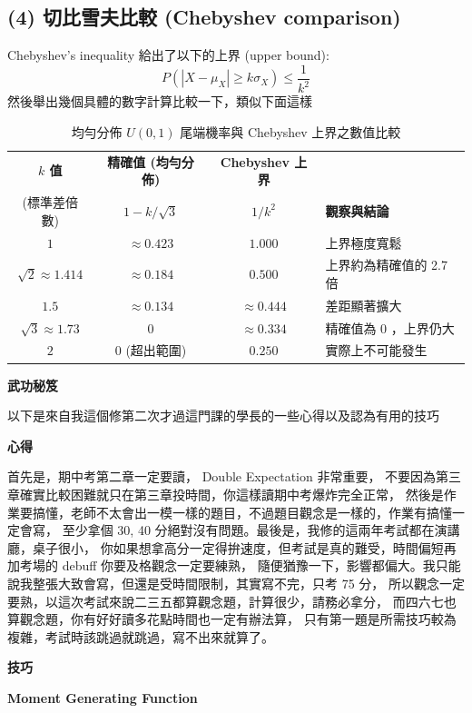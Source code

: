 \documentclass{article}
\begin{document}
\subsection*{(4) 切比雪夫比較 (Chebyshev comparison)}
Chebyshev's inequality 給出了以下的上界 (upper bound):
$$
P\!\left(|X-\mu_X|\ge k\sigma_X\right)\le \frac{1}{k^2}
$$
然後舉出幾個具體的數字計算比較一下，類似下面這樣
\begin{table}[htbp]
    \centering
    \caption{均勻分佈 $U(0,1)$ 尾端機率與 Chebyshev 上界之數值比較}
    \renewcommand{\arraystretch}{1.3}
    \begin{tabular}{cccl}
    \toprule
    \textbf{$k$ 值} & \textbf{精確值 (均勻分佈)} & \textbf{Chebyshev 上界} & \\
    (標準差倍數) & $1 - k/\sqrt{3}$ & $1/k^2$ & \textbf{觀察與結論} \\
    \midrule
    $1$ & $\approx 0.423$ & $1.000$ & 上界極度寬鬆 \\
    $\sqrt{2} \approx 1.414$ & $\approx 0.184$ & $0.500$ & 上界約為精確值的 2.7 倍 \\
    $1.5$ & $\approx 0.134$ & $\approx 0.444$ & 差距顯著擴大 \\
    $\sqrt{3} \approx 1.73$ & $0$ & $\approx 0.334$ & 精確值為 0 ，上界仍大 \\
    $2$ & $0$ \footnotesize{(超出範圍)} & $0.250$ & 實際上不可能發生 \\
    \bottomrule
    \end{tabular}
\end{table}


\clearpage
\begin{center}
    {\Huge \textbf{武功秘笈}}
\end{center}
以下是來自我這個修第二次才過這門課的學長的一些心得以及認為有用的技巧
\begin{center}
    {\huge \textbf{心得}}
\end{center}
首先是，期中考第二章一定要讀， Double Expectation 非常重要，
不要因為第三章確實比較困難就只在第三章投時間，你這樣讀期中考爆炸完全正常，
然後是作業要搞懂，老師不太會出一模一樣的題目，不過題目觀念是一樣的，作業有搞懂一定會寫，
至少拿個 30, 40 分絕對沒有問題。最後是，我修的這兩年考試都在演講廳，桌子很小，
你如果想拿高分一定得拚速度，但考試是真的難受，時間偏短再加考場的 debuff 你要及格觀念一定要練熟，
隨便猶豫一下，影響都偏大。我只能說我整張大致會寫，但還是受時間限制，其實寫不完，只考 75 分， 
所以觀念一定要熟，以這次考試來說二三五都算觀念題，計算很少，請務必拿分，
而四六七也算觀念題，你有好好讀多花點時間也一定有辦法算，
只有第一題是所需技巧較為複雜，考試時該跳過就跳過，寫不出來就算了。
\vspace{0.5cm}
\begin{center}
    {\huge \textbf{技巧}}
\end{center}
\vspace{0.5cm}
\begin{center}
    {\Large \textbf{Moment Generating Function}}
\end{center}
\end{document}
